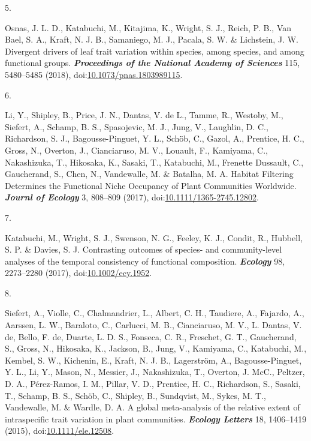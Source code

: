 \documentclass[
]{article}
\newlength{\cslhangindent}
\newlength{\csllabelwidth}
\newlength{\cslentryspacingunit} %
\newenvironment{CSLReferences}[2] %
 {%
  \setlength{\parindent}{0pt}
  \ifodd #1
  \let\oldpar\par
  \def\par{\hangindent=\cslhangindent\oldpar}
  \fi
  \setlength{\parskip}{#2\cslentryspacingunit}
 }%
 {}
\newcommand{\CSLLeftMargin}[1]{\parbox[t]{\csllabelwidth}{#1}}
\newcommand{\CSLRightInline}[1]{\parbox[t]{\linewidth - \csllabelwidth}{#1}\break}
\begin{document}
\begin{CSLReferences}{0}{0}
\leavevmode{}%
\CSLLeftMargin{5. }
\CSLRightInline{Osnas, J. L. D., Katabuchi, M., Kitajima, K., Wright, S.
J., Reich, P. B., Van Bael, S. A., Kraft, N. J. B., Samaniego, M. J.,
Pacala, S. W. \& Lichstein, J. W. Divergent drivers of leaf trait
variation within species, among species, and among functional groups.
\textbf{\emph{Proceedings of the National Academy of Sciences}} 115,
5480--5485 (2018),
doi:\href{https://doi.org/10.1073/pnas.1803989115}{10.1073/pnas.1803989115}.}

\leavevmode{}%
\CSLLeftMargin{6. }
\CSLRightInline{Li, Y., Shipley, B., Price, J. N., Dantas, V. de L.,
Tamme, R., Westoby, M., Siefert, A., Schamp, B. S., Spasojevic, M. J.,
Jung, V., Laughlin, D. C., Richardson, S. J., Bagousse-Pinguet, Y. L.,
Schöb, C., Gazol, A., Prentice, H. C., Gross, N., Overton, J.,
Cianciaruso, M. V., Louault, F., Kamiyama, C., Nakashizuka, T.,
Hikosaka, K., Sasaki, T., Katabuchi, M., Frenette Dussault, C.,
Gaucherand, S., Chen, N., Vandewalle, M. \& Batalha, M. A. {Habitat
Filtering Determines the Functional Niche Occupancy of Plant Communities
Worldwide}. \textbf{\emph{Journl of Ecology}} 3, 808--809 (2017),
doi:\href{https://doi.org/10.1111/1365-2745.12802}{10.1111/1365-2745.12802}.}

\leavevmode{}%
\CSLLeftMargin{7. }
\CSLRightInline{Katabuchi, M., Wright, S. J., Swenson, N. G., Feeley, K.
J., Condit, R., Hubbell, S. P. \& Davies, S. J. Contrasting outcomes of
species- and community-level analyses of the temporal consistency of
functional composition. \textbf{\emph{Ecology}} 98, 2273--2280 (2017),
doi:\href{https://doi.org/10.1002/ecy.1952}{10.1002/ecy.1952}.}

\leavevmode{}%
\CSLLeftMargin{8. }
\CSLRightInline{Siefert, A., Violle, C., Chalmandrier, L., Albert, C.
H., Taudiere, A., Fajardo, A., Aarssen, L. W., Baraloto, C., Carlucci,
M. B., Cianciaruso, M. V., L. Dantas, V. de, Bello, F. de, Duarte, L. D.
S., Fonseca, C. R., Freschet, G. T., Gaucherand, S., Gross, N.,
Hikosaka, K., Jackson, B., Jung, V., Kamiyama, C., Katabuchi, M.,
Kembel, S. W., Kichenin, E., Kraft, N. J. B., Lagerström, A.,
Bagousse-Pinguet, Y. L., Li, Y., Mason, N., Messier, J., Nakashizuka,
T., Overton, J. McC., Peltzer, D. A., Pérez-Ramos, I. M., Pillar, V. D.,
Prentice, H. C., Richardson, S., Sasaki, T., Schamp, B. S., Schöb, C.,
Shipley, B., Sundqvist, M., Sykes, M. T., Vandewalle, M. \& Wardle, D.
A. A global meta-analysis of the relative extent of intraspecific trait
variation in plant communities. \textbf{\emph{Ecology Letters}} 18,
1406--1419 (2015),
doi:\href{https://doi.org/10.1111/ele.12508}{10.1111/ele.12508}.}


\end{CSLReferences}
\end{document}
